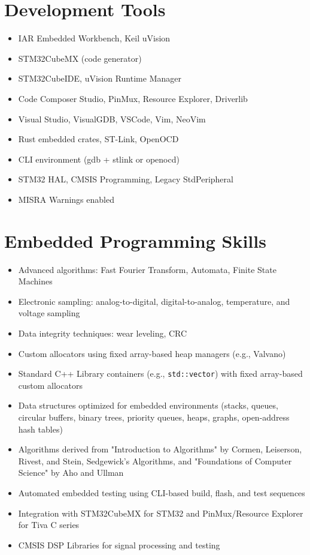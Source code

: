 \documentclass[a4paper,10pt]{article}
\begin{document}
\section*{Development Tools}
\begin{itemize}[leftmargin=1cm]
    \item IAR Embedded Workbench, Keil uVision
    \item STM32CubeMX (code generator)
    \item STM32CubeIDE, uVision Runtime Manager
    \item Code Composer Studio, PinMux, Resource Explorer, Driverlib
    \item Visual Studio, VisualGDB, VSCode, Vim, NeoVim
    \item Rust embedded crates, ST-Link, OpenOCD
    \item CLI environment (gdb + stlink or openocd)
    \item STM32 HAL, CMSIS Programming, Legacy StdPeripheral
    \item MISRA Warnings enabled
\end{itemize}

\section*{Embedded Programming Skills}
\begin{itemize}[leftmargin=1cm]
    \item Advanced algorithms: Fast Fourier Transform, Automata, Finite State Machines
    \item Electronic sampling: analog-to-digital, digital-to-analog, temperature, and voltage sampling
    \item Data integrity techniques: wear leveling, CRC
    \item Custom allocators using fixed array-based heap managers (e.g., Valvano)
    \item Standard C++ Library containers (e.g., \texttt{std::vector}) with fixed array-based custom allocators
    \item Data structures optimized for embedded environments (stacks, queues, circular buffers, binary trees, priority queues, heaps, graphs, open-address hash tables)
    \item Algorithms derived from "Introduction to Algorithms" by Cormen, Leiserson, Rivest, and Stein, Sedgewick's Algorithms, and "Foundations of Computer Science" by Aho and Ullman
    \item Automated embedded testing using CLI-based build, flash, and test sequences
    \item Integration with STM32CubeMX for STM32 and PinMux/Resource Explorer for Tiva C series
    \item CMSIS DSP Libraries for signal processing and testing
\end{itemize}
\end{document}
